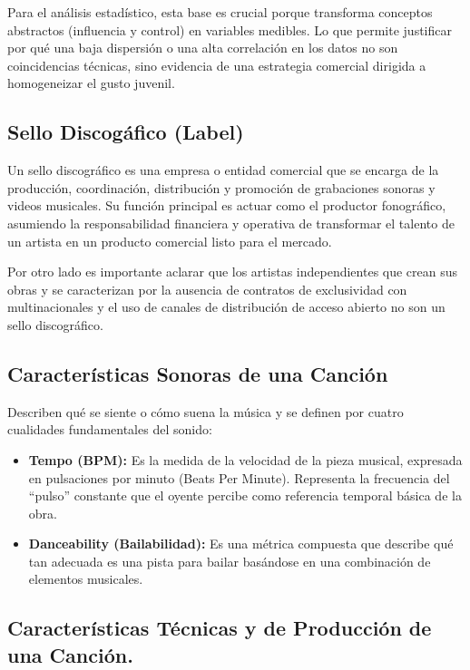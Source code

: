 \documentclass[oneside,11pt]{Latex/Classes/PhDthesisPSnPDF}
\begin{document}
Para el análisis estadístico, esta base es crucial porque transforma
conceptos abstractos (influencia y control) en variables medibles. Lo
que permite justificar por qué una baja dispersión o una alta
correlación en los datos no son coincidencias técnicas, sino evidencia
de una estrategia comercial dirigida a homogeneizar el gusto juvenil.

\subsection{Sello Discogáfico (Label)}

Un sello discográfico es una empresa o entidad comercial que se encarga
de la producción, coordinación, distribución y promoción de grabaciones
sonoras y videos musicales. Su función principal es actuar como el
productor fonográfico, asumiendo la responsabilidad financiera y
operativa de transformar el talento de un artista en un producto
comercial listo para el mercado.

Por otro lado es importante aclarar que los artistas independientes que
crean sus obras y se caracterizan por la ausencia de contratos de
exclusividad con multinacionales y el uso de canales de distribución de
acceso abierto no son un sello discográfico.

\subsection{Características Sonoras de una Canción}

Describen qué se siente o cómo suena la música y se definen por cuatro
cualidades fundamentales del sonido:

\begin{itemize}
\item
  \textbf{Tempo (BPM):} Es la medida de la velocidad de la pieza
  musical, expresada en pulsaciones por minuto (Beats Per Minute).
  Representa la frecuencia del ``pulso'' constante que el oyente percibe
  como referencia temporal básica de la obra.
\item
  \textbf{Danceability (Bailabilidad):} Es una métrica compuesta que
  describe qué tan adecuada es una pista para bailar basándose en una
  combinación de elementos musicales.
\end{itemize}

\subsection{Características Técnicas y de Producción de una Canción.}
\end{document}
